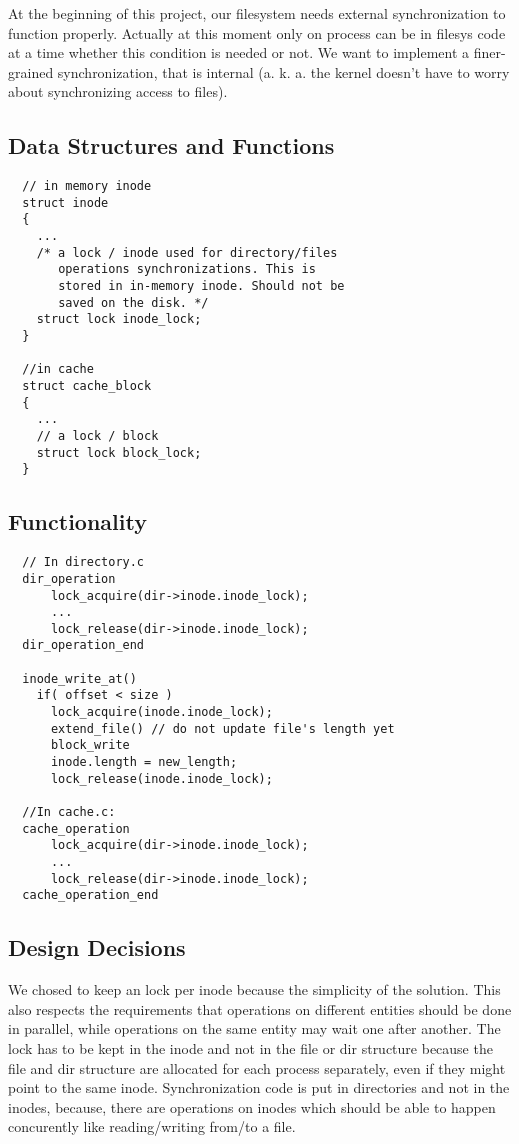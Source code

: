 At the beginning of this project, our filesystem needs external synchronization to function properly. Actually at this moment only on process can be in filesys code at a time whether this condition is needed or not. We want to implement a finer-grained synchronization, that is internal (a. k. a. the kernel doesn't have to worry about synchronizing access to files).
  

\subsection{Data Structures and Functions}
  
\begin{lstlisting}
  // in memory inode 
  struct inode 
  {
    ...
    /* a lock / inode used for directory/files
       operations synchronizations. This is 
       stored in in-memory inode. Should not be
       saved on the disk. */
    struct lock inode_lock; 
  }

  //in cache
  struct cache_block
  {
    ... 
    // a lock / block 
    struct lock block_lock;
  }

\end{lstlisting}

\subsection{Functionality}
  
\begin{lstlisting}
  // In directory.c
  dir_operation
      lock_acquire(dir->inode.inode_lock);
      ...
      lock_release(dir->inode.inode_lock);
  dir_operation_end

  inode_write_at()
    if( offset < size )
      lock_acquire(inode.inode_lock);
      extend_file() // do not update file's length yet
      block_write
      inode.length = new_length;
      lock_release(inode.inode_lock);
    
  //In cache.c:
  cache_operation
      lock_acquire(dir->inode.inode_lock);
      ...
      lock_release(dir->inode.inode_lock);
  cache_operation_end

\end{lstlisting}

\subsection{Design Decisions}
  
We chosed to keep an lock per inode because the simplicity of the solution. This also respects the requirements that operations on different entities should be done in parallel, while operations on the same entity may wait one after another. The lock has to be kept in the inode and not in the file or dir structure because the file and dir structure are allocated for each process separately, even if they might point to the same inode.
Synchronization code is put in directories and not in the inodes, because, there are operations on inodes which should be able to happen concurently like reading/writing from/to a file.

